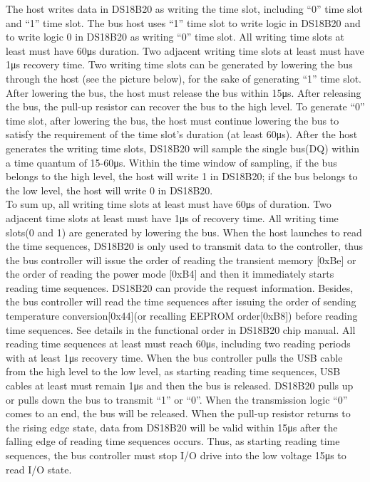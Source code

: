 The host writes data in DS18B20 as writing the time slot, including “0” time slot and “1” time slot. The bus host uses “1” time slot to write logic in DS18B20 and to write logic 0 in DS18B20 as writing “0” time slot. All writing time slots at least must have 60μs duration. Two adjacent writing time slots at least must have 1μs recovery time. Two writing time slots can be generated by lowering the bus through the host (see the picture below), for the sake of generating “1” time slot. 
After lowering the bus, the host must release the bus within 15μs. After releasing the bus, the pull-up resistor can recover the bus to the high level. To generate “0” time slot, after lowering the bus, the host must continue lowering the bus to satisfy the requirement of the time slot’s duration (at least 60μs). 
After the host generates the writing time slots, DS18B20 will sample the single bus(DQ) within a time quantum of 15-60μs. Within the time window of sampling, if the bus belongs to the high level, the host will write 1 in DS18B20; if the bus belongs to the low level, the host will write 0 in DS18B20. 
\\
To sum up, all writing time slots at least must have 60μs of duration. Two adjacent time slots at least must have 1μs of recovery time. All writing time slots(0 and 1) are generated by lowering the bus. 
When the host launches to read the time sequences, DS18B20 is only used to transmit data to the controller, thus the bus controller will issue the order of reading the transient memory [0xBe] or the order of reading the power mode [0xB4] and then it immediately starts reading time sequences. DS18B20 can provide the request information. Besides, the bus controller will read the time sequences after issuing the order of sending temperature conversion[0x44](or recalling EEPROM order[0xB8]) before reading time sequences. See details in the functional order in DS18B20 chip manual. 
All reading time sequences at least must reach 60μs, including two reading periods with at least 1μs recovery time. When the bus controller pulls the USB cable from the high level to the low level, as starting reading time sequences, USB cables at least must remain 1μs and then the bus is released. DS18B20 pulls up or pulls down the bus to transmit “1” or “0”. When the transmission logic “0” comes to an end, the bus will be released. When the pull-up resistor returns to the rising edge state, data from DS18B20 will be valid within 15μs after the falling edge of reading time sequences occurs. Thus, as starting reading time sequences, the bus controller must stop I/O drive into the low voltage 15μs to read I/O state. 
\\

